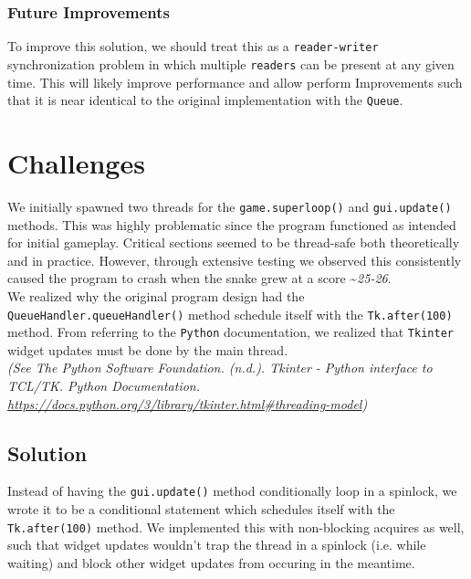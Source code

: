 \documentclass{article}
\begin{document}
\subsubsection{Future Improvements}

To improve this solution, we should treat this as a \texttt{reader-writer} synchronization problem in which multiple \texttt{readers} can be present at any given time. This will likely improve performance and allow perform Improvements
such that it is near identical to the original implementation with the \texttt{Queue}.

\section{Challenges}

We initially spawned two threads for the \texttt{game.superloop()} and \texttt{gui.update()} methods.
This was highly problematic since the program functioned as intended for initial gameplay. Critical sections seemed to be thread-safe both theoretically and in practice.
However, through extensive testing we observed this consistently caused the program to crash when the snake grew at a score \textasciitilde \textit{25-26}. \\

We realized why the original program design had the \texttt{QueueHandler.queueHandler()} method schedule itself with the \texttt{Tk.after(100)} method.
From referring to the \texttt{Python} documentation, we realized that \texttt{Tkinter} widget updates must be done by the main thread. \\
\textit{(See The Python Software Foundation. (n.d.). Tkinter - Python interface to TCL/TK. Python Documentation. \href{https://docs.python.org/3/library/tkinter.html\#threading-model}{https://docs.python.org/3/library/tkinter.html\#threading-model})}

\subsection{Solution}

Instead of having the \texttt{gui.update()} method conditionally loop in a spinlock, we wrote it to be a conditional statement which schedules itself with the \texttt{Tk.after(100)} method.
We implemented this with non-blocking acquires as well, such that widget updates wouldn't trap the thread in a spinlock (i.e. while waiting) and block other widget updates from occuring in the meantime.
\end{document}
